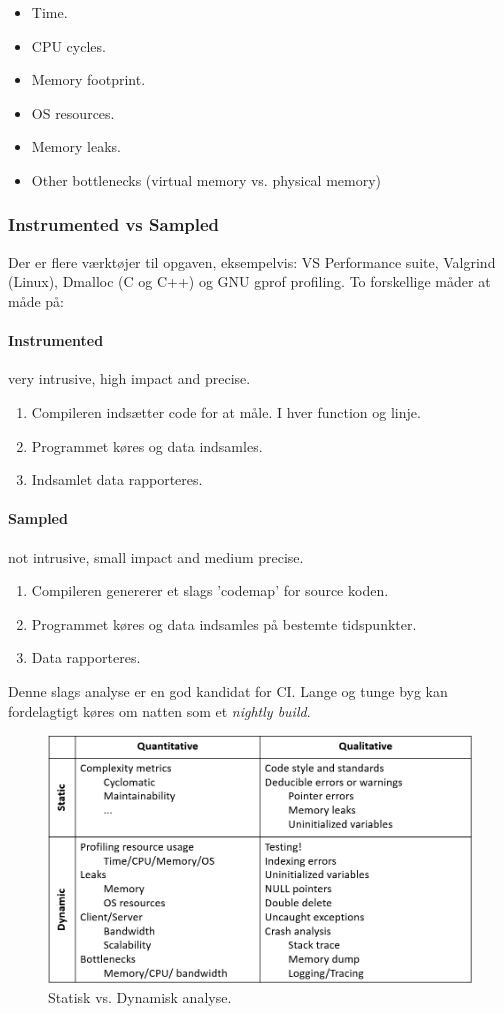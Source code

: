 \begin{itemize}
	\item Time.
	\item CPU cycles.
	\item Memory footprint.
	\item OS resources.
	\item Memory leaks.
	\item Other bottlenecks (virtual memory vs. physical memory)
\end{itemize}

\subsubsection{Instrumented vs Sampled}
Der er flere værktøjer til opgaven, eksempelvis: VS Performance suite, Valgrind (Linux), Dmalloc (C og C++) og GNU gprof profiling. To forskellige måder at måde på:

\paragraph{Instrumented} very intrusive, high impact and precise.

\begin{enumerate}
	\item Compileren indsætter code for at måle. I hver function og linje.
	\item Programmet køres og data indsamles.
	\item Indsamlet data rapporteres.
\end{enumerate}

\paragraph{Sampled} not intrusive, small impact and medium precise.

\begin{enumerate}
	\item Compileren genererer et slags 'codemap' for source koden.
	\item Programmet køres og data indsamles på bestemte tidspunkter.
	\item Data rapporteres.
\end{enumerate}

Denne slags analyse er en god kandidat for CI. Lange og tunge byg kan fordelagtigt køres om natten som et \textit{nightly build}.

\begin{figure}[h]
\centering
\includegraphics[width=\linewidth]{figs/static_dynamic}
\caption{Statisk vs. Dynamisk analyse.}
\label{fig:staticdynamic}
\end{figure}






